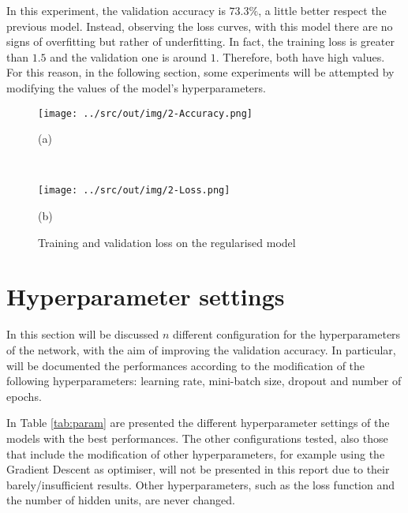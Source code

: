 \documentclass[a4paper,12pt]{article} %
\begin{document}
	In this experiment, the validation accuracy is $73.3\%$, a little better 
	respect the previous model.
	Instead, observing the loss curves, with this model there are no signs of 
	overfitting but rather of underfitting. In fact, the training loss is  
	greater than $1.5$ and the validation one is around $1$. Therefore, both 
	have high values. For this reason, in the following section, some 
	experiments will be attempted by modifying the values of the model's 
	hyperparameters.
	
	\begin{figure}[htb]
		\begin{minipage}[c]{.49\textwidth}
			\centering
			\texttt{[image: ../src/out/img/2-Accuracy.png]}
			\caption*{(a)}
		\end{minipage}
		~
		\begin{minipage}[c]{.49\textwidth}
			\centering
			\texttt{[image: ../src/out/img/2-Loss.png]}
			\caption*{(b)}
		\end{minipage}
		\caption{Training and validation loss on the regularised model}
		\label{fig:model1-performance}
	\end{figure}
	  
	\section{Hyperparameter settings}
	\label{section:hyperparam}
	
	In this section will be discussed $n$ different configuration for the 
	hyperparameters of the network, with the aim of improving the validation 
	accuracy. In particular, will be documented the performances according to 
	the modification of the following hyperparameters: learning rate, 
	mini-batch size, dropout and number of epochs.
	
	In Table \ref{tab:param} are presented the different hyperparameter 
	settings of the models with the best performances. The other configurations 
	tested, also those that include the modification of other hyperparameters, 
	for example using the Gradient Descent as optimiser, will not be presented 
	in this report due to their barely/insufficient results. Other 
	hyperparameters, such as the loss function and the number of hidden units, 
	are never changed. 
	
\end{document}
